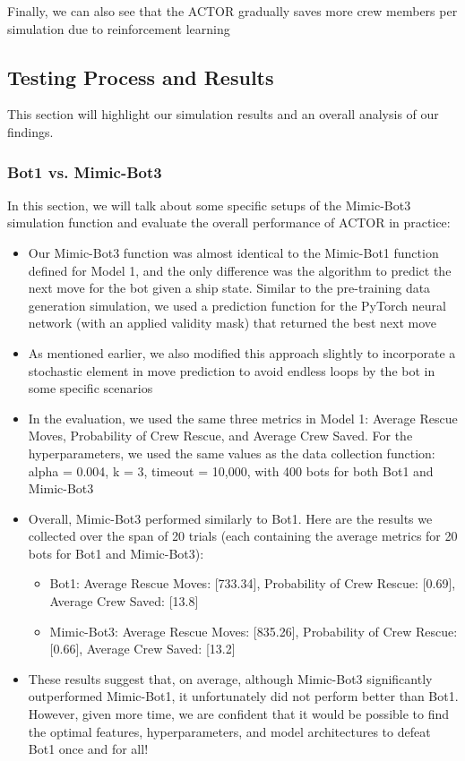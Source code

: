 \documentclass[11pt]{article}
\begin{document}
Finally, we can also see that the ACTOR gradually saves more crew members per simulation due to reinforcement learning

\subsection{Testing Process and Results}

This section will highlight our simulation results and an overall analysis of our findings.

\subsubsection{Bot1 vs. Mimic-Bot3}

In this section, we will talk about some specific setups of the Mimic-Bot3 simulation function and evaluate the overall performance of ACTOR in practice:

\begin{itemize}
    \item Our Mimic-Bot3 function was almost identical to the Mimic-Bot1 function defined for Model 1, and the only difference was the algorithm to predict the next move for the bot given a ship state. Similar to the pre-training data generation simulation, we used a prediction function for the PyTorch neural network (with an applied validity mask) that returned the best next move
    \item As mentioned earlier, we also modified this approach slightly to incorporate a stochastic element in move prediction to avoid endless loops by the bot in some specific scenarios
    \item In the evaluation, we used the same three metrics in Model 1: Average Rescue Moves, Probability of Crew Rescue, and Average Crew Saved. For the hyperparameters, we used the same values as the data collection function: alpha = 0.004, k = 3, timeout = 10,000, with 400 bots for both Bot1 and Mimic-Bot3
    \item Overall, Mimic-Bot3 performed similarly to Bot1. Here are the results we collected over the span of 20 trials (each containing the average metrics for 20 bots for Bot1 and Mimic-Bot3):
    \begin{itemize}
        \item Bot1: {Average Rescue Moves: [733.34]}, {Probability of Crew Rescue: [0.69]}, {Average Crew Saved: [13.8]}
        \item Mimic-Bot3: {Average Rescue Moves: [835.26]}, {Probability of Crew Rescue: [0.66]}, {Average Crew Saved: [13.2]}
    \end{itemize}
    \item These results suggest that, on average, although Mimic-Bot3 significantly outperformed Mimic-Bot1, it unfortunately did not perform better than Bot1. However, given more time, we are confident that it would be possible to find the optimal features, hyperparameters, and model architectures to defeat Bot1 once and for all!
\end{itemize}
\end{document}

